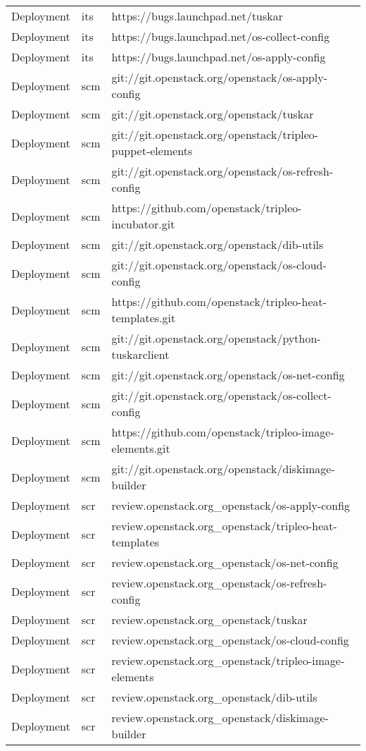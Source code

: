 \begin{center}
\begin{longtable}{|p{4cm}|p{1cm}|p{10cm}|}
Deployment&its&https://bugs.launchpad.net/tuskar\\ 
Deployment&its&https://bugs.launchpad.net/os-collect-config\\ 
Deployment&its&https://bugs.launchpad.net/os-apply-config\\ 
Deployment&scm&git://git.openstack.org/openstack/os-apply-config\\ 
Deployment&scm&git://git.openstack.org/openstack/tuskar\\ 
Deployment&scm&git://git.openstack.org/openstack/tripleo-puppet-elements\\ 
Deployment&scm&git://git.openstack.org/openstack/os-refresh-config\\ 
Deployment&scm&https://github.com/openstack/tripleo-incubator.git\\ 
Deployment&scm&git://git.openstack.org/openstack/dib-utils\\ 
Deployment&scm&git://git.openstack.org/openstack/os-cloud-config\\ 
Deployment&scm&https://github.com/openstack/tripleo-heat-templates.git\\ 
Deployment&scm&git://git.openstack.org/openstack/python-tuskarclient\\ 
Deployment&scm&git://git.openstack.org/openstack/os-net-config\\ 
Deployment&scm&git://git.openstack.org/openstack/os-collect-config\\ 
Deployment&scm&https://github.com/openstack/tripleo-image-elements.git\\ 
Deployment&scm&git://git.openstack.org/openstack/diskimage-builder\\ 
Deployment&scr&review.openstack.org\_openstack/os-apply-config\\ 
Deployment&scr&review.openstack.org\_openstack/tripleo-heat-templates\\ 
Deployment&scr&review.openstack.org\_openstack/os-net-config\\ 
Deployment&scr&review.openstack.org\_openstack/os-refresh-config\\ 
Deployment&scr&review.openstack.org\_openstack/tuskar\\ 
Deployment&scr&review.openstack.org\_openstack/os-cloud-config\\ 
Deployment&scr&review.openstack.org\_openstack/tripleo-image-elements\\ 
Deployment&scr&review.openstack.org\_openstack/dib-utils\\ 
Deployment&scr&review.openstack.org\_openstack/diskimage-builder\\ 

\end{longtable}
\end{center}
